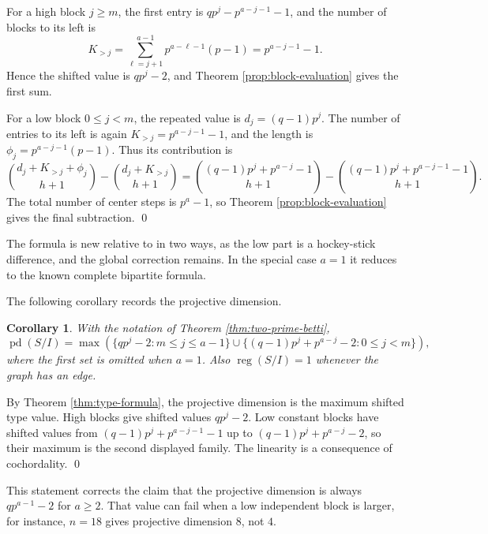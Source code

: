\documentclass[12pt]{article}
\newtheorem{corollary}[theorem]{Corollary}
\theoremstyle{definition}
\renewenvironment{proof}{{\bf \noindent Proof.}}{\qed}
\begin{document}
\begin{proof}
For a high block $j\geq m$, the first entry is $qp^j-p^{a-j-1}-1$, and the number of blocks to its left is
$$
K_{>j}=\sum_{\ell=j+1}^{a-1}p^{a-\ell-1}(p-1)=p^{a-j-1}-1.
$$
Hence the shifted value is $qp^j-2$, and Theorem \ref{prop:block-evaluation} gives the first sum.

\medskip

For a low block $0\leq j<m$, the repeated value is $d_j=(q-1)p^j$.  The number of entries to its left is again $K_{>j}=p^{a-j-1}-1$, and the length is $\phi_j=p^{a-j-1}(p-1)$.  Thus its contribution is
$$
\binom{d_j+K_{>j}+\phi_j}{h+1}-\binom{d_j+K_{>j}}{h+1}
=\binom{(q-1)p^j+p^{a-j}-1}{h+1}-\binom{(q-1)p^j+p^{a-j-1}-1}{h+1}.
$$
The total number of center steps is $p^a-1$, so Theorem \ref{prop:block-evaluation} gives the final subtraction.
\end{proof}

\medskip

The formula is new relative to \cite{DungVu2026} in two ways, as the low part is a hockey-stick difference, and the global correction remains.  In the special case $a=1$ it reduces to the known complete bipartite formula.

\medskip

\noindent The following corollary records the projective dimension.
\begin{corollary}\label{cor:two-prime-pd}
With the notation of Theorem \ref{thm:two-prime-betti},
$$
\operatorname{pd}(S/I)=\max\left(\{qp^j-2:m\leq j\leq a-1\}\cup\{(q-1)p^j+p^{a-j}-2:0\leq j<m\}\right),
$$
where the first set is omitted when $a=1$.  Also $\operatorname{reg}(S/I)=1$ whenever the graph has an edge.
\end{corollary}

\begin{proof}
By Theorem \ref{thm:type-formula}, the projective dimension is the maximum shifted type value.  High blocks give shifted values $qp^j-2$.  Low constant blocks have shifted values from $(q-1)p^j+p^{a-j-1}-1$ up to $(q-1)p^j+p^{a-j}-2$, so their maximum is the second displayed family.  The linearity is a consequence of cochordality.
\end{proof}

\medskip

This statement corrects the claim that the projective dimension is always $qp^{a-1}-2$ for $a\geq 2$.  That value can fail when a low independent block is larger, for instance, $n=18$ gives projective dimension $8$, not $4$.
\end{document}
